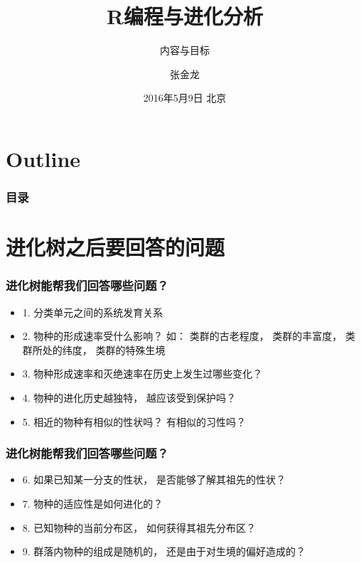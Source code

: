 \documentclass[UTF8]{beamer}
\begin{document}
\title{R编程与进化分析} 
\subtitle{内容与目标}
\author{张金龙} 
\date{2016年5月9日 北京} 


\frame{\titlepage} 


\section*{Outline}
\begin{frame}
\frametitle{目录}
\tableofcontents
\end{frame}

\section{进化树之后要回答的问题}


\begin{frame}
\frametitle{进化树能帮我们回答哪些问题？}
\begin{itemize}
\item 1. 分类单元之间的系统发育关系
\item 2. 物种的形成速率受什么影响？ 如： 类群的古老程度， 类群的丰富度， 类群所处的纬度， 类群的特殊生境
\item 3. 物种形成速率和灭绝速率在历史上发生过哪些变化？
\item 4. 物种的进化历史越独特， 越应该受到保护吗？
\item 5. 相近的物种有相似的性状吗？ 有相似的习性吗？
\end{itemize}
\end{frame}


\begin{frame}
\frametitle{进化树能帮我们回答哪些问题？}
\begin{itemize}
\item 6. 如果已知某一分支的性状， 是否能够了解其祖先的性状？ 
\item 7. 物种的适应性是如何进化的？ 
\item 8. 已知物种的当前分布区， 如何获得其祖先分布区？
\item 9. 群落内物种的组成是随机的， 还是由于对生境的偏好造成的？
\end{itemize}
\end{frame}
\end{document}
